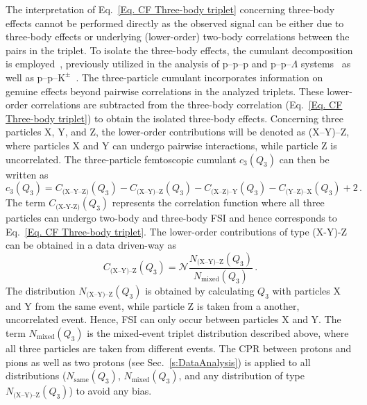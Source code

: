 \documentclass[ALICE,manyauthors]{cernphprep}
\begin{document}
The interpretation of Eq.~\eqref{Eq. CF Three-body triplet} concerning three-body effects cannot be performed directly as the observed signal can be either due to three-body effects or underlying (lower-order) two-body correlations between the pairs in the triplet. To isolate the three-body effects, the cumulant decomposition is employed~\cite{Kubo}, previously utilized in the analysis of p--p--p and p--p--$\Lambda$ systems~\cite{ALICE:ppp-ppL} as well as p--p--$\text{K}^\pm$~\cite{ALICE:ppK}. The three-particle cumulant incorporates information on genuine effects beyond pairwise correlations in the analyzed triplets.
These lower-order correlations are subtracted from the three-body correlation (Eq.~\eqref{Eq. CF Three-body triplet}) to obtain the isolated three-body effects. Concerning three particles X, Y, and Z, the lower-order contributions will be denoted as (X--Y)--Z, where particles X and Y can undergo pairwise interactions, while particle Z is uncorrelated. The three-particle femtoscopic cumulant $c_3(Q_3)$ can then be written as
\begin{equation}
    c_3(Q_3) = C_\text{(X--Y--Z)}(Q_3)  - C_\text{(X--Y)--Z}(Q_3) - C_\text{(X--Z)--Y}(Q_3) - C_\text{(Y--Z)--X}(Q_3) + 2 \,. \label{Eq. Cumulant CF}
\end{equation}
The term $C_{\text{(X-Y-Z)}}(Q_3)$ represents the correlation function where all three particles can undergo two-body and three-body FSI and hence corresponds to Eq.~\eqref{Eq. CF Three-body triplet}. The lower-order contributions of type (X-Y)-Z can be obtained in a data driven-way as
\begin{equation}
    C_\text{(X--Y)--Z}(Q_3) = \mathcal{N} \frac{N_\text{(X--Y)--Z}(Q_3)}{N_{\text{mixed}}(Q_3)} \,. \label{Eq. Lower-order CF}
\end{equation}
The distribution $N_\text{(X--Y)--Z}(Q_3)$ is obtained by calculating $Q_3$ with particles X and Y from the same event, while particle Z is taken from a another, uncorrelated event. Hence, FSI can only occur between particles X and Y. The term $N_{\text{mixed}}(Q_3)$ is the mixed-event triplet distribution described above, where all three particles are taken from different events. The CPR between protons and pions as well as two protons (see Sec.~\ref{s:DataAnalysis}) is applied to all distributions ($N_{\text{same}}(Q_3)$, $N_{\text{mixed}}(Q_3)$, and any distribution of type $N_\text{(X--Y)--Z}(Q_3)$) to avoid any bias.
\end{document}
